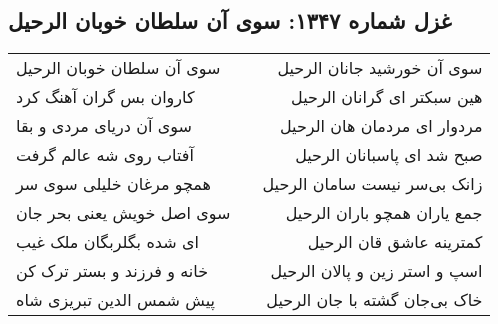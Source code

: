 \begin{center}
\section*{غزل شماره ۱۳۴۷: سوی آن سلطان خوبان الرحیل}
\label{sec:1347}
\begin{longtable}{l p{0.5cm} r}
سوی آن سلطان خوبان الرحیل
&&
سوی آن خورشید جانان الرحیل
\\
کاروان بس گران آهنگ کرد
&&
هین سبکتر ای گرانان الرحیل
\\
سوی آن دریای مردی و بقا
&&
مردوار ای مردمان هان الرحیل
\\
آفتاب روی شه عالم گرفت
&&
صبح شد ای پاسبانان الرحیل
\\
همچو مرغان خلیلی سوی سر
&&
زانک بی‌سر نیست سامان الرحیل
\\
سوی اصل خویش یعنی بحر جان
&&
جمع یاران همچو باران الرحیل
\\
ای شده بگلربگان ملک غیب
&&
کمترینه عاشق قان الرحیل
\\
خانه و فرزند و بستر ترک کن
&&
اسپ و استر زین و پالان الرحیل
\\
پیش شمس الدین تبریزی شاه
&&
خاک بی‌جان گشته با جان الرحیل
\\
\end{longtable}
\end{center}
